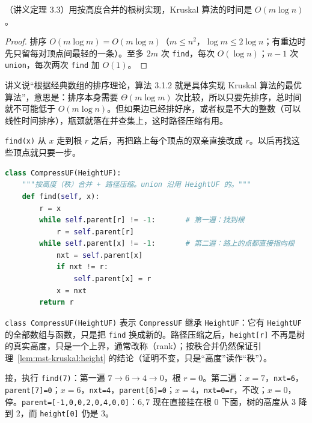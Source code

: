 \begin{theorem}\label{thm:mst-kruskal:height-time}
（讲义定理 3.3）用按高度合并的根树实现，Kruskal 算法的时间是 $O(m\log n)$。
\end{theorem}
\begin{proof}
排序 $O(m\log m)=O(m\log n)$（$m\leqslant n^2$，$\log m\leqslant2\log n$；有重边时先只留每对顶点间最轻的一条）。至多 $2m$ 次 \texttt{find}，每次 $O(\log n)$；$n-1$ 次 \texttt{union}，每次两次 \texttt{find} 加 $O(1)$。
\end{proof}

讲义说“根据经典数组的排序理论，算法 3.1.2 就是具体实现 Kruskal 算法的最优算法”，意思是：排序本身需要 $\Theta(m\log m)$ 次比较，所以只要先排序，总时间就不可能低于 $O(m\log n)$。但如果边已经排好序，或者权是不大的整数（可以线性时间排序），瓶颈就落在并查集上，这时路径压缩有用。


\texttt{find(x)} 从 $x$ 走到根 $r$ 之后，再把路上每个顶点的双亲直接改成 $r$。以后再找这些顶点就只要一步。

\begin{lstlisting}[language=Python]
class CompressUF(HeightUF):
    """按高度（秩）合并 + 路径压缩。union 沿用 HeightUF 的。"""
    def find(self, x):
        r = x
        while self.parent[r] != -1:       # 第一遍：找到根
            r = self.parent[r]
        while self.parent[x] != -1:       # 第二遍：路上的点都直接指向根
            nxt = self.parent[x]
            if nxt != r:
                self.parent[x] = r
            x = nxt
        return r
\end{lstlisting}

\texttt{class CompressUF(HeightUF)} 表示 \texttt{CompressUF} 继承 \texttt{HeightUF}：它有 \texttt{HeightUF} 的全部数组与函数，只是把 \texttt{find} 换成新的。路径压缩之后，\texttt{height[r]} 不再是树的真实高度，只是一个上界，通常改称（rank）；按秩合并仍然保证引理~\ref{lem:mst-kruskal:height} 的结论（证明不变，只是“高度”读作“秩”）。

\begin{example}
接，执行 \texttt{find(7)}：第一遍 $7\to6\to4\to0$，根 $r=0$。第二遍：$x=7$，\texttt{nxt=6}，\texttt{parent[7]=0}；$x=6$，\texttt{nxt=4}，\texttt{parent[6]=0}；$x=4$，\texttt{nxt=0=r}，不改；$x=0$，停。\texttt{parent=[-1,0,0,2,0,4,0,0]}：$6,7$ 现在直接挂在根 $0$ 下面，树的高度从 $3$ 降到 $2$，而 \texttt{height[0]} 仍是 $3$。
\end{example}

